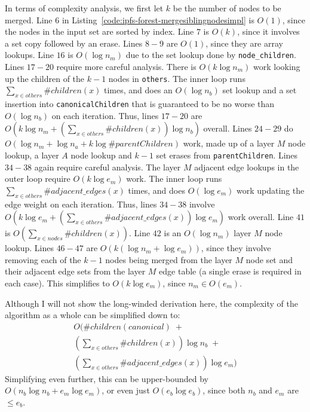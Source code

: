 In terms of complexity analysis, we first let $k$ be the number of nodes to be merged. Line $6$ in Listing~\ref{code:ipfs-forest-mergesiblingnodesimpl} is $O(1)$, since the nodes in the input set are sorted by index. Line $7$ is $O(k)$, since it involves a set copy followed by an erase. Lines $8-9$ are $O(1)$, since they are array lookups. Line $16$ is $O(\log n_m)$ due to the set lookup done by \texttt{node_children}. Lines $17-20$ require more careful analysis. There is $O(k \log n_m)$ work looking up the children of the $k-1$ nodes in \texttt{others}. The inner loop runs $\sum_{x \in \mathit{others}} \#children(x)$ times, and does an $O(\log n_b)$ set lookup and a set insertion into \texttt{canonicalChildren} that is guaranteed to be no worse than $O(\log n_b)$ on each iteration. Thus, lines $17-20$ are $O(k \log n_m + (\sum_{x \in \mathit{others}} \#\mathit{children}(x)) \log n_b)$ overall. Lines $24-29$ do $O(\log n_m + \log n_a + k \log \#\mathit{parentChildren})$ work, made up of a layer $M$ node lookup, a layer $A$ node lookup and $k-1$ set erases from \texttt{parentChildren}. Lines $34-38$ again require careful analysis. The layer $M$ adjacent edge lookups in the outer loop require $O(k \log e_m)$ work. The inner loop runs $\sum_{x \in \mathit{others}} \#\mathit{adjacent\_edges}(x)$ times, and does $O(\log e_m)$ work updating the edge weight on each iteration. Thus, lines $34-38$ involve $O(k \log e_m + (\sum_{x \in \mathit{others}} \#\mathit{adjacent\_edges}(x)) \log e_m)$ work overall. Line $41$ is $O(\sum_{x \in \mathit{nodes}} \#\mathit{children}(x))$. Line $42$ is an $O(\log n_m)$ layer $M$ node lookup. Lines $46-47$ are $O(k(\log n_m + \log e_m))$, since they involve removing each of the $k-1$ nodes being merged from the layer $M$ node set and their adjacent edge sets from the layer $M$ edge table (a single erase is required in each case). This simplifies to $O(k \log e_m)$, since $n_m \in O(e_m)$.

Although I will not show the long-winded derivation here, the complexity of the algorithm as a whole can be simplified down to:
%
\begin{eqnarray*}
O(\#children(\mathit{canonical}) \; + \\
\left(\sum_{x \in others} \#\mathit{children}(x)\right) \log n_b \; + \\
\left(\sum_{x \in \mathit{others}} \#\mathit{adjacent\_edges}(x)\right) \log e_m)
\end{eqnarray*}
%
Simplifying even further, this can be upper-bounded by $O(n_b \log n_b + e_m \log e_m)$, or even just $O(e_b \log e_b)$, since both $n_b$ and $e_m$ are $\le e_b$.

